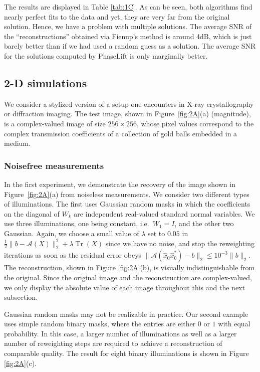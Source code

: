 \documentclass[11pt]{article}
\newcommand{\<}{\langle}
\renewcommand{\>}{\rangle}
\newcommand{\cA}{\mathcal{A}}
\newcommand{\trace}{\operatorname{Tr}}
\numberwithin{equation}{section}
\begin{document}
The results are displayed in Table \ref{tab:1C}.  As can be seen, both
algorithms find nearly perfect fits to the data and yet, they are very
far from the original solution. Hence, we have a problem with multiple
solutions.  The average SNR of the ``reconstructions'' obtained via
Fienup's method is around 4dB, which is just barely better than if we
had used a random guess as a solution. The average SNR for the
solutions computed by PhaseLift %
is only marginally better.

\subsection{2-D simulations}  \label{ss:num2d}

We consider a stylized version of a setup one encounters in X-ray
crystallography or diffraction imaging.  The test image, shown in
Figure~\ref{fig:2A}(a) (magnitude), is a complex-valued image of size
$256 \times 256$, whose pixel values correspond to the complex
transmission coefficients of a collection of gold balls embedded in a
medium.

\subsubsection{Noisefree measurements} \label{sss:2dnoisefree}

In the first experiment, we demonstrate the recovery of the image
shown in Figure~\ref{fig:2A}(a) from noiseless measurements. We
consider two different types of illuminations. The first uses Gaussian
random masks in which the coefficients on the diagonal of $W_k$ are
independent real-valued standard normal variables. 
We use three illuminations, one being constant, i.e.~$W_1
= I$, and the other two Gaussian. Again, we choose a small value of
$\lambda$ set to $0.05$ in $\frac12 \|b - \cA(X)\|_2^2 + \lambda
\trace(X)$ since we have no noise, and stop the reweighting iterations
as soon as the residual error obeys $\|\cA(\hat{x}_0 \hat{x}_0^*) -
b\|_2 \le 10^{-3} \|b\|_2$.  The reconstruction, shown in Figure
\ref{fig:2A}(b), is visually indistinguishable from the original.
Since the original image and the reconstruction are complex-valued,
we only display the absolute value of each image throughout this and
the next subsection.

Gaussian random masks may not be realizable in practice. Our second
example uses simple random binary masks, where the entries are either
$0$ or $1$ with equal probability.  In this case, a larger number of
illuminations as well as a larger number of reweighting steps are
required to achieve a reconstruction of comparable quality. The result
for eight binary illuminations is shown in Figure \ref{fig:2A}(c).
\end{document}
